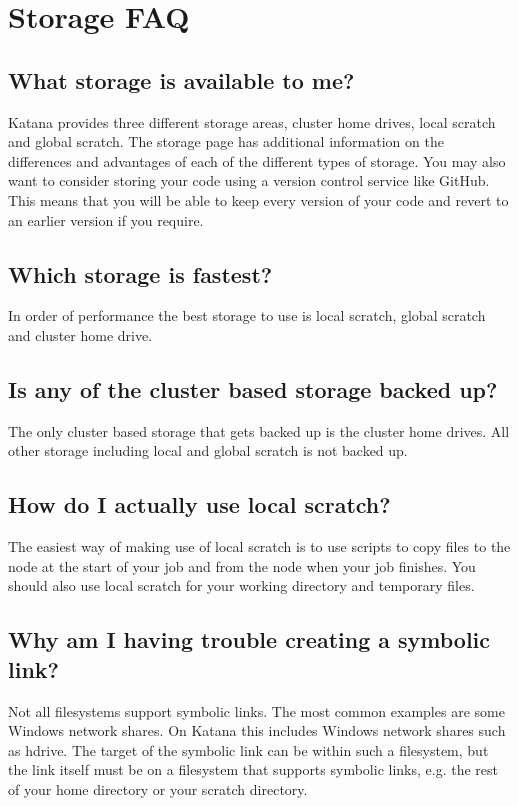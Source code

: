\documentclass[letterpaper,10pt,english]{sphinxmanual}
\begin{document}
\section{Storage FAQ}
\label{\detokenize{faq:storage-faq}}\label{\detokenize{faq:id1}}

\subsection{What storage is available to me?}
\label{\detokenize{faq:what-storage-is-available-to-me}}
Katana provides three different storage areas, cluster home drives, local scratch and global scratch. The storage page has additional information on the differences and advantages of each of the different types of storage. You may also want to consider storing your code using a version control service like GitHub. This means that you will be able to keep every version of your code and revert to an earlier version if you require.


\subsection{Which storage is fastest?}
\label{\detokenize{faq:which-storage-is-fastest}}
In order of performance the best storage to use is local scratch, global scratch and cluster home drive.


\subsection{Is any of the cluster based storage backed up?}
\label{\detokenize{faq:is-any-of-the-cluster-based-storage-backed-up}}
The only cluster based storage that gets backed up is the cluster home drives. All other storage including local and global scratch is not backed up.


\subsection{How do I actually use local scratch?}
\label{\detokenize{faq:how-do-i-actually-use-local-scratch}}
The easiest way of making use of local scratch is to use scripts to copy files to the node at the start of your job and from the node when your job finishes. You should also use local scratch for your working directory and temporary files.


\subsection{Why am I having trouble creating a symbolic link?}
\label{\detokenize{faq:why-am-i-having-trouble-creating-a-symbolic-link}}
Not all filesystems support symbolic links. The most common examples are some Windows network shares. On Katana this includes Windows network shares such as hdrive. The target of the symbolic link can be within such a filesystem, but the link itself must be on a filesystem that supports symbolic links, e.g. the rest of your home directory or your scratch directory.
\end{document}
